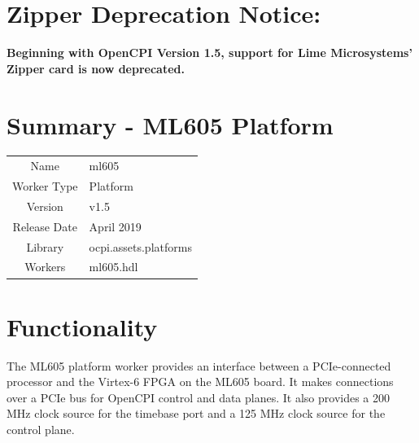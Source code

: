 \documentclass{article}
\author{} %
\date{Version \docVersion} %
\title{\docTitle}
\def\docVersion{1.5}
\def\comp{ml605}
\def\Comp{ML605 Platform}
\begin{document}
\section*{Zipper Deprecation Notice:}
\textbf{Beginning with OpenCPI Version 1.5, support for Lime Microsystems' Zipper card is now deprecated.}


\section*{Summary - \Comp}
\begin{tabular}{|c|M{13.5cm}|}
	\hline
	                  & \\
	\hline
	Name              & \comp \\
	\hline
	Worker Type       & Platform \\
	\hline
	Version           & v\docVersion \\
	\hline
	Release Date      & April 2019 \\
	\hline
	Library & ocpi.assets.platforms \\
	\hline
	Workers & \comp.hdl \\
	\hline
\end{tabular}

\section*{Functionality}
\begin{flushleft}
	The ML605 platform worker provides an interface between a PCIe-connected processor and the Virtex-6 FPGA on the ML605 board. It makes connections over a PCIe bus for OpenCPI control and data planes. It also provides a 200 MHz clock source for the timebase port and a 125 MHz clock source for the control plane.
\end{flushleft}
\end{document}
